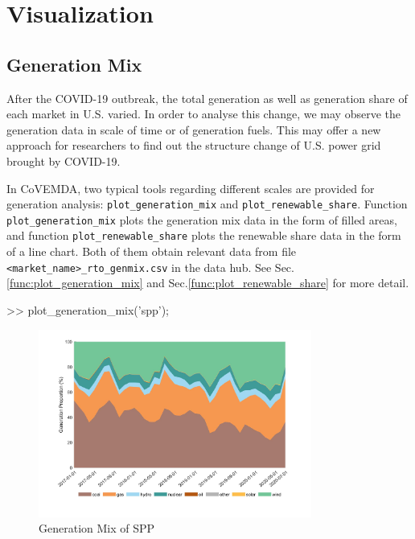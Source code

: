 \documentclass[10pt]{article}
\newcommand{\covemda}{CoVEMDA}
\numberwithin{equation}{section}
\numberwithin{table}{section}
\numberwithin{figure}{section}
\begin{document}
\newpage
\section{Visualization} \label{sec:visual}

\subsection{Generation Mix}

After the COVID-19 outbreak, the total generation as well as generation share of each market in U.S. varied. In order to analyse this change, we may observe the generation data in scale of time or of generation fuels. This may offer a new approach for researchers to find out the structure change of U.S. power grid brought by COVID-19.

In \covemda{}, two typical tools regarding different scales are provided for generation analysis: \verb!plot_generation_mix! and \verb!plot_renewable_share!. Function \verb!plot_generation_mix! plots the generation mix data in the form of filled areas, and function \verb!plot_renewable_share! plots the renewable share data in the form of a line chart. Both of them obtain relevant data from file \verb!<market_name>_rto_genmix.csv! in the data hub. See Sec.\ref{func:plot_generation_mix} and Sec.\ref{func:plot_renewable_share} for more detail.

\begin{Code}
>> plot_generation_mix('spp');
\end{Code}

\begin{figure}[ht]
  \centering
  \noindent\includegraphics[width=0.8\textwidth]{figures/visualization_plot_generation_mix.jpg}
  \caption{Generation Mix of SPP} \label{fig:vis_1}
\end{figure}
\end{document}
